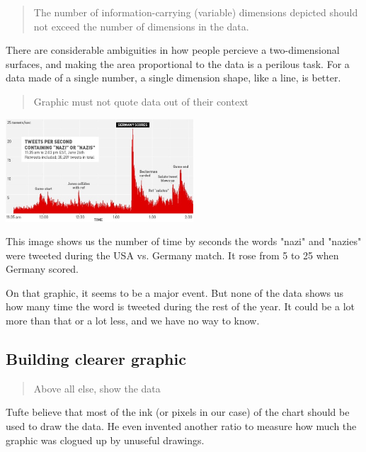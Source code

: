 \hrulefill

\begin{quote}
The number of information-carrying (variable) dimensions depicted should not exceed the number of dimensions in the data.
\end{quote}

There are considerable ambiguities in how people percieve a two-dimensional surfaces, and making the area proportional to the data is a perilous task. For a data made of a single number, a single dimension shape, like a line, is better.

\hrulefill

\begin{quote}
Graphic must not quote data out of their context
\end{quote}

\centerline{
\includegraphics[width=07cm]{./illustrations/annexes/temps_nazi.eps}
}
This image shows us the number of time by seconds the words "nazi" and "nazies" were tweeted during the USA vs. Germany match. It rose from 5 to 25 when Germany scored.

On that graphic, it seems to be a major event. But none of the data shows us how many time the word is tweeted during the rest of the year.
 It could be a lot more than that or a lot less, and we have no way to know.









\subsection{Building clearer graphic}
\begin{quote}
Above all else, show the data
\end{quote}

Tufte believe that most of the ink (or pixels in our case) of the chart should be used to draw the data. He even invented another ratio to measure how much the graphic was clogued up by unuseful drawings.

